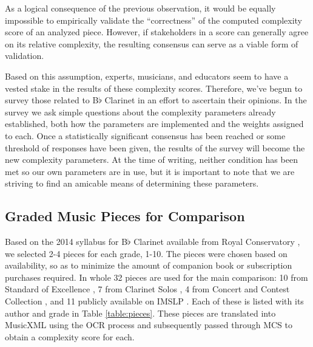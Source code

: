\documentclass[10pt,preprint]{sigplanconf}
\begin{document}
As a logical consequence of the previous observation, it would be equally impossible to empirically validate the ``correctness'' of the computed complexity score of an analyzed piece. However, if stakeholders in a score can generally agree on its relative complexity, the resulting consensus can serve as a viable form of validation.

Based on this assumption, experts, musicians, and educators seem to have a vested stake in the results of these complexity scores. Therefore, we've begun to survey those related to B$\flat$ Clarinet in an effort to ascertain their opinions. In the survey we ask simple questions about the complexity parameters already established, both how the parameters are implemented and the weights assigned to each. Once a statistically significant consensus has been reached or some threshold of responses have been given, the results of the survey will become the new complexity parameters. At the time of writing, neither condition has been met so our own parameters are in use, but it is important to note that we are striving to find an amicable means of determining these parameters.

\subsection{Graded Music Pieces for Comparison}
\label{sec:pieces}

Based on the 2014 syllabus for B$\flat$ Clarinet available from Royal Conservatory \cite{RoyalSyllabus}, we selected 2-4 pieces for each grade, 1-10. The pieces were chosen based on availability, so as to minimize the amount of companion book or subscription purchases required. In whole 32 pieces are used for the main comparison: 10 from Standard of Excellence \cite{Standard}, 7 from Clarinet Solos \cite{Solos}, 4 from Concert and Contest Collection \cite{Concert}, and 11 publicly available on IMSLP \cite{IMSLP}. Each of these is listed with its author and grade in Table \ref{table:pieces}. These pieces are translated into MusicXML using the OCR process and subsequently passed through MCS to obtain a complexity score for each.
\end{document}
